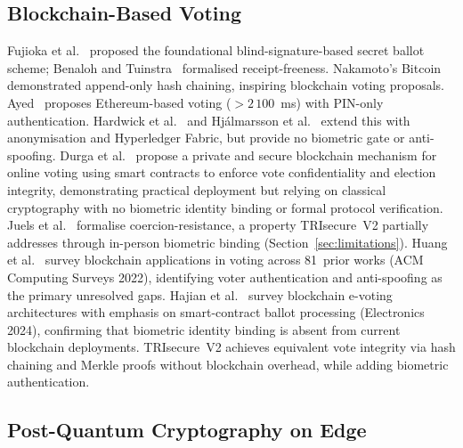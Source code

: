 \documentclass[pdflatex,sn-vancouver-num]{sn-jnl}%
\theoremstyle{thmstyleone}%
\theoremstyle{thmstyletwo}%
\theoremstyle{thmstylethree}%
\begin{document}
\subsection{Blockchain-Based Voting}

Fujioka et al.~\cite{fujioka1992practical} proposed the foundational
blind-signature-based secret ballot scheme; Benaloh and
Tuinstra~\cite{benaloh1994receipt} formalised receipt-freeness. Nakamoto's
Bitcoin~\cite{nakamoto2008bitcoin} demonstrated append-only hash chaining,
inspiring blockchain voting proposals. Ayed~\cite{ayed2017conceptual} proposes
Ethereum-based voting (\(>2\,100\)~ms) with PIN-only authentication.
Hardwick et al.~\cite{hardwick2018voting} and Hj\'{a}lmarsson et
al.~\cite{hjalmarsson2018blockchain} extend this with anonymisation and
Hyperledger Fabric, but provide no biometric gate or anti-spoofing.
Durga et al.~\cite{durga2022blockchain} propose a private and secure
blockchain mechanism for online voting using smart contracts to enforce vote
confidentiality and election integrity, demonstrating practical deployment
but relying on classical cryptography with no biometric identity binding or
formal protocol verification. Juels et
al.~\cite{juels2005coercion} formalise coercion-resistance, a property
TRIsecure~V2 partially addresses through in-person biometric binding
(Section~\ref{sec:limitations}). Huang et al.~\cite{huang2022blockchain_voting}
survey blockchain applications in voting across 81~prior works (ACM Computing
Surveys 2022), identifying voter authentication and anti-spoofing as the
primary unresolved gaps. Hajian et al.~\cite{hajian2024blockchain} survey
blockchain e-voting architectures with emphasis on smart-contract ballot
processing (Electronics 2024), confirming that biometric identity binding is
absent from current blockchain deployments. TRIsecure~V2 achieves equivalent
vote integrity via hash chaining and Merkle proofs without blockchain overhead,
while adding biometric authentication.

\subsection{Post-Quantum Cryptography on Edge}
\end{document}

